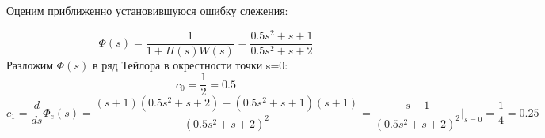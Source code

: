 \documentclass[a4paper, 10pt]{article}
\begin{document}
Оценим приближенно установившуюся ошибку слежения:

\begin{equation}
\varPhi(s) = \frac{1}{{1 + H(s)W(s)}} = \frac{{0.5{s^2} + s + 1}}{{0.5{s^2} + s + 2}}
\end{equation}
Разложим $\varPhi(s)$ в ряд Тейлора в окрестности точки s=0:
\[{c_0} = \frac{1}{2} = 0.5\]
\[{c_1} = \frac{d}{{ds}}{\Phi _e}(s) = \frac{{(s + 1)(0.5{s^2} + s + 2) - (0.5{s^2} + s + 1)(s + 1)}}{{{{(0.5{s^2} + s + 2)}^2}}} = \frac{{s + 1}}{{{{(0.5{s^2} + s + 2)}^2}}}{|_{s = 0}} = \frac{1}{4} = 0.25\]
\end{document}
